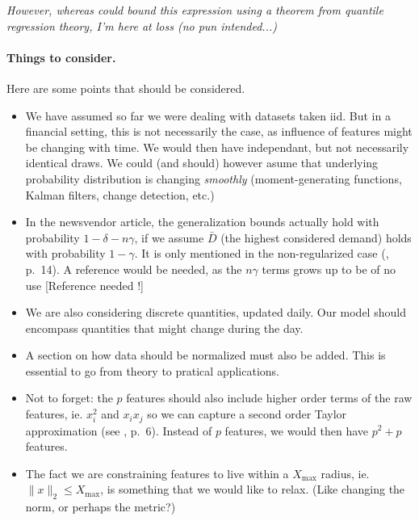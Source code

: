 \textit{However, whereas \cite{rudin2015} could bound this expression using a theorem from
  quantile regression theory, I'm here at loss (no pun intended...)}





\paragraph{Things to consider.}

Here are some points that should be considered.

\begin{itemize}
\item We have assumed so far we were dealing with datasets taken iid. But in a financial
  setting, this is not necessarily the case, as influence of features might be changing
  with time. We would then have independant, but not necessarily identical draws. We could
  (and should) however asume that underlying probability distribution is changing
  \textsl{smoothly} (moment-generating functions, Kalman filters, change detection, etc.)
\item In the newsvendor article, the generalization bounds actually hold with probability
  $1-\delta - n\gamma$, if we assume $\bar D$ (the highest considered demand) holds with
  probability $1-\gamma$. It is only mentioned in the non-regularized case
  (\cite{rudin2015}, p.~14). A reference would be needed, as the $n\gamma$ terms grows up
  to be of no use [Reference needed !]
\item We are also considering discrete quantities, updated daily. Our model should
  encompass quantities that might change during the day.
\item A section on how data should be normalized must also be added. This is essential to
  go from theory to pratical applications. 
\item Not to forget: the $p$ features should also include higher order terms of the raw
  features, ie. $x_i^2$ and $x_ix_j$ so we can capture a second order Taylor approximation
  (see \cite{rudin2015}, p.~6). Instead of $p$ features, we would then have $p^2+p$
  features. 
\item The fact we are constraining features to live within a $X_{\max}{}$ radius, ie.
  $\|x\|_2\leq X_{\max}$, is something that we would like to relax. (Like changing the norm,
  or perhaps the metric?)
\end{itemize}
